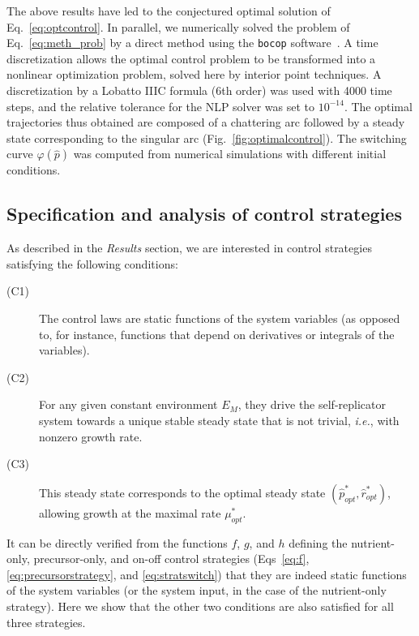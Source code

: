 The above results have led to the conjectured optimal solution of Eq.~\ref{eq:optcontrol}.
In parallel, we numerically solved the problem of Eq.~\ref{eq:meth_prob} by a direct method using the \texttt{bocop} software~\cite{bonnans_bocop_2012}.
A time discretization allows the optimal control problem to be transformed into a nonlinear optimization problem,
solved here by interior point techniques.
A discretization by a Lobatto IIIC formula (6th order) was used with 4000 time steps, and the relative tolerance for the NLP solver was set to $10^{-14}$.
The optimal trajectories thus obtained are composed of a chattering arc followed by a steady state corresponding to the singular arc (Fig.~\ref{fig:optimalcontrol}).
The switching curve $\varphi(\hat{p})$ was computed from numerical simulations with different initial conditions. 

\subsection{Specification and analysis of control strategies}

As described in the \textit{Results} section, we are interested in control strategies satisfying the following conditions:
\begin{description}
\item[(C1)] The control laws are static functions of the system variables (as opposed to, for instance, functions that depend on derivatives or integrals of the variables).
\item[(C2)] For any given constant environment $E_M$, they drive the self-replicator system towards a unique stable steady state that is not trivial, \textit{i.e.}, with nonzero growth rate.
\item[(C3)] This steady state corresponds to the optimal steady state $(\hat{p}_{opt}^*, \hat{r}_{opt}^*)$, allowing growth at the maximal rate $\mu^*_{opt}$.
\end{description}
It can be directly verified from the functions $f$, $g$, and $h$ defining the nutrient-only, precursor-only, and on-off control strategies (Eqs~\ref{eq:f}, \ref{eq:precursorstrategy}, and \ref{eq:stratswitch}) that they are indeed static functions of the system variables (or the system input, in the case of the nutrient-only strategy). 
Here we show that the other two conditions are also satisfied for all three strategies.

